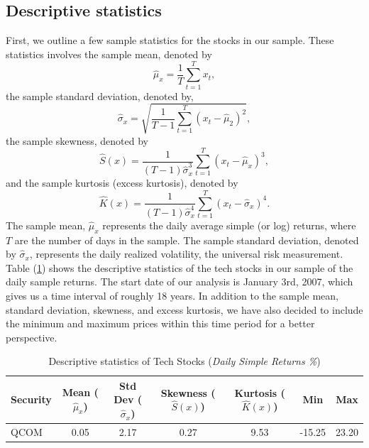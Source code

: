 \documentclass[12pt]{article}
\begin{document}
\subsection{Descriptive statistics}
First, we outline a few sample statistics for the stocks in our sample. These statistics involves the sample mean, denoted by
\begin{equation}
	\hat{\mu}_x=\frac{1}{T}\sum_{t=1}^{T}x_t,
\end{equation}
the sample standard deviation, denoted by,
\begin{equation}
	\hat{\sigma}_x=\sqrt{\frac{1}{T-1}\sum_{t=1}^{T}\left(x_t-\hat{\mu}_2\right)^2},
\end{equation}
the sample skewness, denoted by
\begin{equation}
	\hat{S}(x)=\frac{1}{\left(T-1\right)\hat{\sigma}^3_x}\sum_{t=1}^{T}\left(x_t-\hat{\mu}_x\right)^3,
\end{equation}
and the sample kurtosis (excess kurtosis), denoted by
\begin{equation}
	\hat{K}(x)=\frac{1}{\left(T-1\right)\hat{\sigma}^4_x}\sum_{t=1}^{T}\left(x_t-\hat{\sigma}_x\right)^4.
\end{equation}
The sample mean, $\hat{\mu}_x$ represents the daily average simple (or log) returns, where $T$ are the number of days in the sample. The sample standard deviation, denoted by $\hat{\sigma}_x$, represents the daily realized volatility, the universal risk measurement. Table (\ref{tab:descriptive}) shows the descriptive statistics of the tech stocks in our sample of the daily sample returns. The start date of our analysis is January 3rd, 2007, which gives us a time interval of roughly 18 years. In addition to the sample mean, standard deviation, skewness, and excess kurtosis, we have also decided to include the minimum and maximum prices within this time period for a better perspective.
\begin{table}[ht]
	\centering
	\caption{Descriptive statistics of Tech Stocks (\textit{Daily Simple Returns \%})}
	\begin{tabular}[t]{lcccccc}
		\toprule
		Security & Mean ($\hat{\mu}_x$) & Std Dev ($\hat{\sigma}_x$) & Skewness ($\hat{S}(x)$) & Kurtosis ($\hat{K}(x)$) &Min&Max \\
		\midrule
		QCOM & 0.05 & 2.17 & 0.27 & 9.53 &-15.25&23.20 \\
		\bottomrule
	\end{tabular}\label{tab:descriptive}
\end{table}
\end{document}
